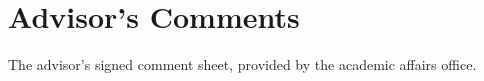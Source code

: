 \chapter*{Advisor's Comments}
\label{advisor}

The advisor's signed comment sheet, provided by the academic affairs office.
